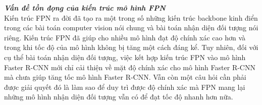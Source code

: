 {    \noindent
    \textbf{\textit{Vấn đề tồn đọng của kiến trúc mô hình FPN}} \\
    Kiến trúc FPN ra đời đã tạo ra một trong số những kiến trúc backbone kinh điển trong các bài toán computer vision nói chung và bài toán nhận diện đối tượng nói riêng.
    Kiến trúc FPN đã giúp cho nhiều mô hình đạt độ chính xác cao hơn và trong khi tốc độ của mô hình không bị tăng một cách đáng kể.
    Tuy nhiên, đối với cụ thể bài toán nhận diện đối tượng, việc kết hợp kiến trúc FPN vào mô hình Faster R-CNN mới chỉ cải thiện về mặt độ chính xác cho mô hình Faster R-CNN mà chưa giúp tăng tốc mô hình Faster R-CNN.
    Vẫn còn một câu hỏi cần phải được giải quyết đó là làm sao để duy trì được độ chính xác mà FPN mang lại những mô hình nhận diện đối tượng vẫn có để đạt tốc độ nhanh hơn nữa.
}
